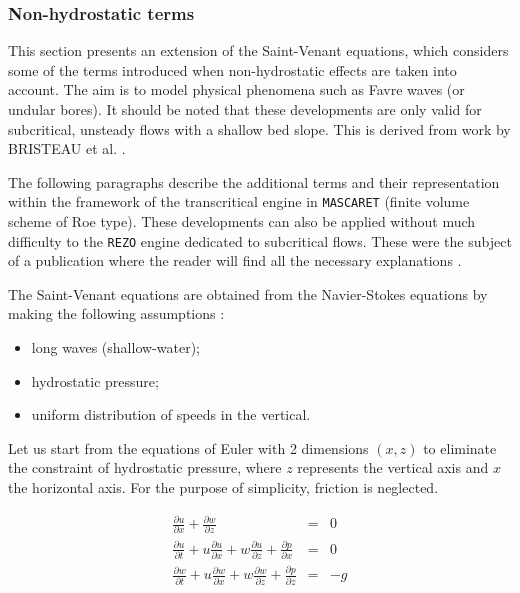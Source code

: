 \subsubsection{Non-hydrostatic terms}

This section presents an extension of the Saint-Venant equations, which considers some of the terms introduced when non-hydrostatic effects are taken into account. The aim is to model physical phenomena such as Favre waves (or undular bores). It should be noted that these developments are only valid for subcritical, unsteady flows with a shallow bed slope. This is derived from work by BRISTEAU et al. \cite{BRISTEAU11}.

\vspace{0.5cm}

The following paragraphs describe the additional terms and their representation within the framework of the transcritical engine in \texttt{MASCARET} (finite volume scheme of Roe type). These developments can also be applied without much difficulty to the \texttt{REZO} engine dedicated to subcritical flows. These were the subject of a publication where the reader will find all the necessary explanations \cite{BRISTEAU11}.

\vspace{0.5cm}

The Saint-Venant equations are obtained from the Navier-Stokes equations by making the following assumptions :
\begin{itemize}
  \item long waves (shallow-water);
  \item hydrostatic pressure;
  \item uniform distribution of speeds in the vertical.
\end{itemize}

\vspace{0.5cm}

Let us start from the equations of Euler with 2 dimensions $(x,z)$ to eliminate the constraint of hydrostatic pressure, where $z$ represents the vertical axis and $x$ the horizontal axis. For the purpose of simplicity, friction is neglected. 

\begin{eqnarray}
\frac{\partial u}{\partial x} + \frac{\partial w}{\partial z} & = & 0 \label{eq:NS_2d1}\\
\frac{\partial u}{\partial t} + u \frac{\partial u}{\partial x} + w \frac{\partial u}{\partial z} + \frac{\partial p}{\partial x} & = & 0 \label{eq:NS_2d2}\\
\frac{\partial w}{\partial t} + u\frac{\partial w}{\partial x} + w\frac{\partial w}{\partial z} + \frac{\partial p}{\partial z} & = & -g \label{eq:NS_2d3}
\end{eqnarray}


